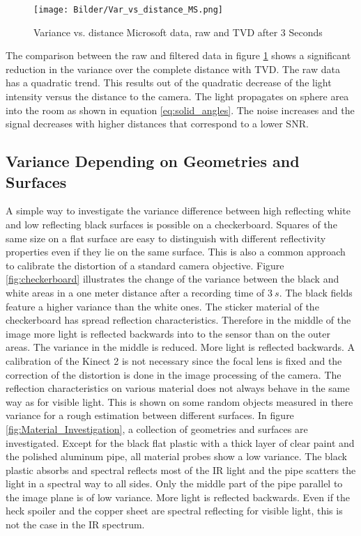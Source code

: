 \begin{figure}[!h]
	\centering
	\texttt{[image: Bilder/Var\_vs\_distance\_MS.png]}
	\caption{Variance vs. distance Microsoft data, raw and TVD after 3 Seconds}
	\label{fig:Variance_TVDvsRAW}
\end{figure}

The comparison between the raw and filtered data in figure \ref{fig:Variance_TVDvsRAW} shows a significant reduction in the variance over the complete distance with TVD. The raw data has a quadratic trend. This results out of the quadratic decrease of the light intensity versus the distance to the camera. The light propagates on sphere area into the room as shown in equation \ref{eq:solid_angles}. The noise increases and the signal decreases with higher distances that correspond to a lower SNR. 

\subsection{Variance Depending on Geometries and Surfaces}
A simple way to investigate the variance difference between high reflecting white and low reflecting black surfaces is possible on a checkerboard. Squares of the same size on a flat surface are easy to distinguish with different reflectivity properties even if they lie on the same surface. This is also a common approach to calibrate the distortion of a standard camera objective. Figure \ref{fig:checkerboard} illustrates the change of the variance between the black and white areas in a one meter distance after a recording time of $3~s$. The black fields feature a higher variance than the white ones. The sticker material of the checkerboard has spread reflection characteristics. Therefore in the middle of the image more light is reflected backwards into to the sensor than on the outer areas. The variance in the middle is reduced. More light is reflected backwards. A calibration of the Kinect 2 is not necessary since the focal lens is fixed and the correction of the distortion is done in the image processing of the camera. 
The reflection characteristics on various material does not always behave in the same way as for visible light. This is shown on some random objects measured in there variance for a rough estimation between different surfaces. In figure \ref{fig:Material_Investigation}, a collection of geometries and surfaces are investigated. Except for the black flat plastic with a thick layer of clear paint and the polished aluminum pipe, all material probes show a low variance. The black plastic absorbs and spectral reflects most of the IR light and the pipe scatters the light in a spectral way to all sides. Only the middle part of the pipe parallel to the image plane is of low variance. More light is reflected backwards. Even if the heck spoiler and the copper sheet are spectral reflecting for visible light, this is not the case in the IR spectrum.\\ 

